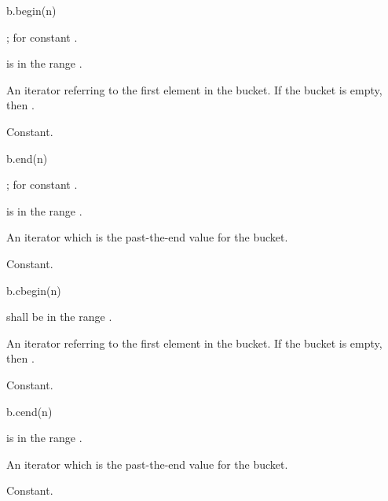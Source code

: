 %
\begin{itemdecl}
b.begin(n)
\end{itemdecl}

\begin{itemdescr}
\pnum
\result
{};  for constant .

\pnum
\expects
{} is in the range \tcode{[0, b.bucket_count())}.

\pnum
\returns
An iterator referring to the first element in the bucket.
If the bucket is empty, then .

\pnum
\complexity
Constant.
\end{itemdescr}

%
\begin{itemdecl}
b.end(n)
\end{itemdecl}

\begin{itemdescr}
\pnum
\result
{};  for constant .

\pnum
\expects
{} is in the range \tcode{[0, b.bucket_count())}.

\pnum
\returns
An iterator which is the past-the-end value for the bucket.

\pnum
\complexity
Constant.
\end{itemdescr}

%
\begin{itemdecl}
b.cbegin(n)
\end{itemdecl}

\begin{itemdescr}
\pnum
\result
{}

\pnum
\expects
{} shall be in the range \tcode{[0, b.bucket_count())}.

\pnum
\returns
An iterator referring to the first element in the bucket.
If the bucket is empty, then .

\pnum
\complexity
Constant.
\end{itemdescr}

%
\begin{itemdecl}
b.cend(n)
\end{itemdecl}

\begin{itemdescr}
\pnum
\result
{}

\pnum
\expects
{} is in the range \tcode{[0, b.bucket_count())}.

\pnum
\returns
An iterator which is the past-the-end value for the bucket.

\pnum
\complexity
Constant.
\end{itemdescr}

